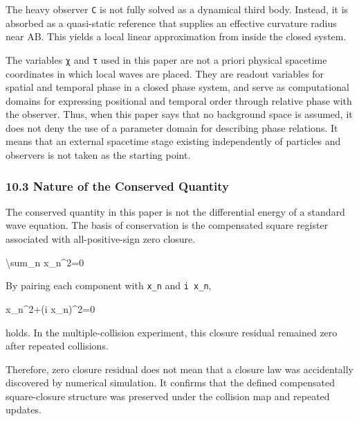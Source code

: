 \documentclass[
  a4paper,
]{article}
\newenvironment{Shaded}{}{}
\newcommand{\NormalTok}[1]{#1}
\begin{document}
The heavy observer \texttt{C} is not fully solved as a dynamical third
body. Instead, it is absorbed as a quasi-static reference that supplies
an effective curvature radius near AB. This yields a local linear
approximation from inside the closed system.

The variables \texttt{χ} and \texttt{τ} used in this paper are not a
priori physical spacetime coordinates in which local waves are placed.
They are readout variables for spatial and temporal phase in a closed
phase system, and serve as computational domains for expressing
positional and temporal order through relative phase with the observer.
Thus, when this paper says that no background space is assumed, it does
not deny the use of a parameter domain for describing phase relations.
It means that an external spacetime stage existing independently of
particles and observers is not taken as the starting point.

\subsubsection{10.3 Nature of the Conserved
Quantity}\label{nature-of-the-conserved-quantity}

The conserved quantity in this paper is not the differential energy of a
standard wave equation. The basis of conservation is the compensated
square register associated with all-positive-sign zero closure.

\begin{Shaded}
\begin{Highlighting}[]
\NormalTok{\textbackslash{}sum\_n x\_n\^{}2=0}
\end{Highlighting}
\end{Shaded}

By pairing each component with \texttt{x\_n} and \texttt{i\ x\_n},

\begin{Shaded}
\begin{Highlighting}[]
\NormalTok{x\_n\^{}2+(i x\_n)\^{}2=0}
\end{Highlighting}
\end{Shaded}

holds. In the multiple-collision experiment, this closure residual
remained zero after repeated collisions.

Therefore, zero closure residual does not mean that a closure law was
accidentally discovered by numerical simulation. It confirms that the
defined compensated square-closure structure was preserved under the
collision map and repeated updates.
\end{document}
